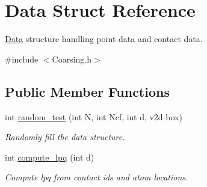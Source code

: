\hypertarget{structData}{}\section{Data Struct Reference}
\label{structData}


\hyperlink{structData}{Data} structure handling point data and contact data.  




{\ttfamily \#include $<$Coarsing.\+h$>$}

\subsection*{Public Member Functions}
\begin{DoxyCompactItemize}
\item 
\mbox{\label{structData_a52baee43793f5f03088eb32a36f4c6fb}} 
int \hyperlink{structData_a52baee43793f5f03088eb32a36f4c6fb}{random\+\_\+test} (int N, int Ncf, int d, v2d box)
\begin{DoxyCompactList}\small\item\em Randomly fill the data structure. \end{DoxyCompactList}\item 
\mbox{\label{structData_aba0bdd673b8a3d0401deb7da3e479735}} 
int \hyperlink{structData_aba0bdd673b8a3d0401deb7da3e479735}{compute\+\_\+lpq} (int d)
\begin{DoxyCompactList}\small\item\em Compute lpq from contact id\textquotesingle{}s and atom locations. \end{DoxyCompactList}\end{DoxyCompactItemize}
